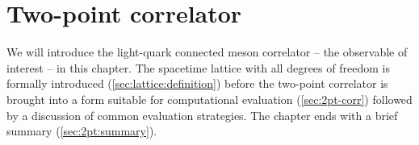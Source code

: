 \chapter{Two-point correlator}
\label{ch:p2:2pt-corr}



We will introduce the light-quark connected meson correlator -- the observable of interest -- in this chapter.
The spacetime lattice with all degrees of freedom is formally introduced (\cref{sec:lattice:definition}) before the two-point correlator is brought into a form suitable for computational evaluation (\cref{sec:2pt-corr}) followed by a discussion of common evaluation strategies.
The chapter ends with a brief summary (\cref{sec:2pt:summary}).







